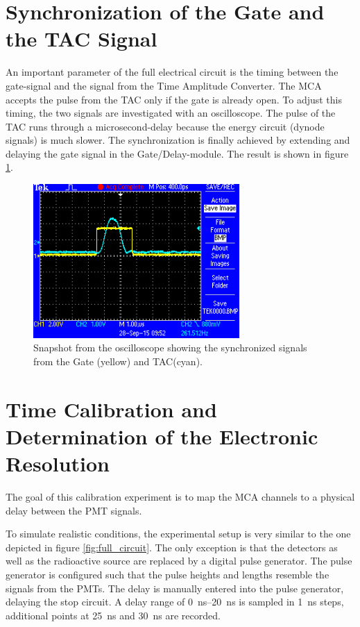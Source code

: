 \documentclass[
	paper=A4,
	parskip=full,
	chapterprefix=true,
	11pt,
	headings=normal,
	bibliography=totoc,
	listof=totoc,
	titlepage=on,
]{scrreprt}
\begin{document}
\section{Synchronization of the Gate and the TAC Signal}
An important parameter of the full electrical circuit is the timing between the gate-signal and the signal from the Time Amplitude Converter. The MCA accepts the pulse from the TAC only if the gate is already open. To adjust this timing, the two signals are investigated with an oscilloscope. The pulse of the TAC runs through a microsecond-delay because the energy circuit (dynode signals) is much slower. The synchronization is finally achieved by extending and delaying the gate signal in the Gate/Delay-module. The result is shown in figure \ref{fig:GateDynode_sync}.

\begin{figure}[h]
	\centering
	\includegraphics[width=0.7\textwidth]{../images/gate_vs_dynode/F0002TEK.png}
	\caption{Snapshot from the oscilloscope showing the synchronized signals from the Gate (yellow) and TAC(cyan).}
	\label{fig:GateDynode_sync}
\end{figure}

\FloatBarrier
\section{Time Calibration and Determination of the Electronic Resolution}
\label{time_calib}
The goal of this calibration experiment is to map the MCA channels to a physical delay between the PMT signals. 

To simulate realistic conditions, the experimental setup is very similar to the one depicted in figure \ref{fig:full_circuit}. The only  exception is that the detectors as well as the radioactive source are replaced by a digital pulse generator. The pulse generator is configured such that the pulse heights and lengths resemble the signals from the PMTs.  
The delay is manually entered into the pulse generator, delaying the stop circuit. A delay range of \SIrange{0}{20}{\nano\second} is sampled in \SI{1}{\nano\second} steps, additional points at \SI{25}{\nano\second} and \SI{30}{\nano\second} are recorded.
\end{document}
